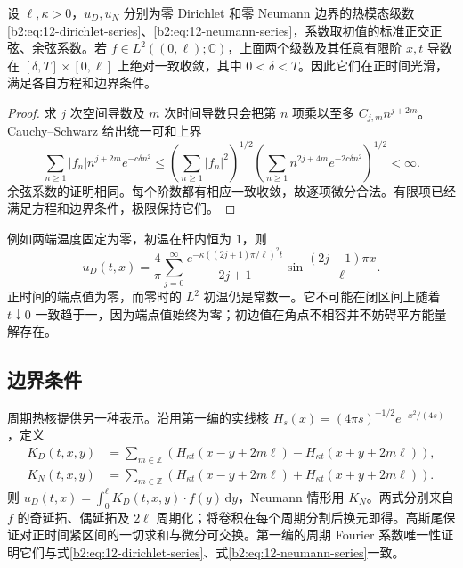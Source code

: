 \begin{proposition}[正时间的经典解]\label{b2:prop:12-interval-smooth}
设 \(\ell,\kappa>0\)，\(u_D,u_N\) 分别为零 Dirichlet 和零 Neumann 边界的热模态级数\eqref{b2:eq:12-dirichlet-series}、\eqref{b2:eq:12-neumann-series}，系数取初值的标准正交正弦、余弦系数。若 \(f\in L^2((0,\ell);\mathbb C)\)，上面两个级数及其任意有限阶 \(x,t\) 导数在 \([\delta,T]\times[0,\ell]\) 上绝对一致收敛，其中 \(0<\delta<T\)。因此它们在正时间光滑，满足各自方程和边界条件。
\end{proposition}
\begin{proof}
求 \(j\) 次空间导数及 \(m\) 次时间导数只会把第 \(n\) 项乘以至多 \(C_{j,m}n^{j+2m}\)。Cauchy--Schwarz 给出统一可和上界
\[
 \sum_{n\geq1}|f_n|n^{j+2m}e^{-c\delta n^2}
 \leq\left(\sum_{n\geq1}|f_n|^2\right)^{1/2}
 \left(\sum_{n\geq1}n^{2j+4m}e^{-2c\delta n^2}\right)^{1/2}<\infty.
\]
余弦系数的证明相同。每个阶数都有相应一致收敛，故逐项微分合法。有限项已经满足方程和边界条件，极限保持它们。
\end{proof}

例如两端温度固定为零，初温在杆内恒为 \(1\)，则
\[
 u_D(t,x)=\dfrac4\pi\sum_{j=0}^{\infty}
 \dfrac{e^{-\kappa((2j+1)\pi/\ell)^2t}}{2j+1}
 \sin\dfrac{(2j+1)\pi x}{\ell}.
\]
正时间的端点值为零，而零时的 \(L^2\) 初温仍是常数一。它不可能在闭区间上随着 \(t\downarrow0\) 一致趋于一，因为端点值始终为零；初边值在角点不相容并不妨碍平方能量解存在。

\subsection{边界条件}
\label{b2:subsec:120103}

周期热核提供另一种表示。沿用第一编的实线核 \(H_s(x)=(4\pi s)^{-1/2}e^{-x^2/(4s)}\)，定义
\begin{align*}
 K_D(t,x,y)&=\sum_{m\in\mathbb Z}
 \left(H_{\kappa t}(x-y+2m\ell)-H_{\kappa t}(x+y+2m\ell)\right),\\
 K_N(t,x,y)&=\sum_{m\in\mathbb Z}
 \left(H_{\kappa t}(x-y+2m\ell)+H_{\kappa t}(x+y+2m\ell)\right).
\end{align*}
则 \(u_D(t,x)=\int_0^\ell K_D(t,x,y)\cdot f(y)\,\mathrm{d}y\)，Neumann 情形用 \(K_N\)。两式分别来自 \(f\) 的奇延拓、偶延拓及 \(2\ell\) 周期化；将卷积在每个周期分割后换元即得。高斯尾保证对正时间紧区间的一切求和与微分可交换。第一编的周期 Fourier 系数唯一性证明它们与式\eqref{b2:eq:12-dirichlet-series}、式\eqref{b2:eq:12-neumann-series}一致。

\ProseParagraphBreak

